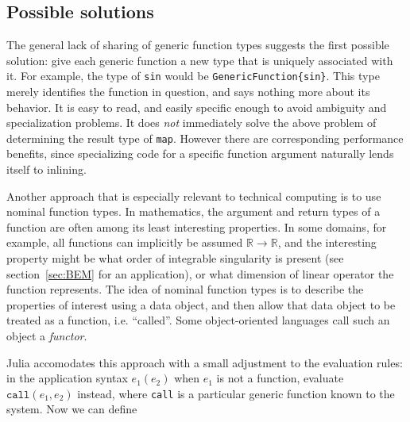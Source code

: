 \subsection{Possible solutions}

The general lack of sharing of generic function types suggests the first
possible solution: give each generic function a new type that is uniquely
associated with it. For example, the type of \texttt{sin} would be
\texttt{GenericFunction\{sin\}}. This type merely identifies the function
in question, and says nothing more about its behavior. It is easy to read,
and easily specific enough to avoid ambiguity and specialization
problems. It does \emph{not} immediately solve the above problem of
determining the result type of \texttt{map}. However there are
corresponding performance benefits, since specializing code for a
specific function argument naturally lends itself to inlining.


Another approach that is especially relevant to technical computing is to use
nominal function types.
In mathematics, the argument and return types of a function are often among its
least interesting properties.
In some domains, for example, all functions can implicitly be assumed
$\mathbb{R}\rightarrow\mathbb{R}$, and the interesting property might be
what order of integrable singularity is present (see section~\ref{sec:BEM} for
an application), or what dimension of linear operator the function represents.
The idea of nominal function types is to describe the properties of interest
using a data object, and then allow that data object to be treated as a
function, i.e. ``called''. Some object-oriented languages call such an object
a \emph{functor}.

Julia accomodates this approach with a small adjustment to the evaluation
rules: in the application syntax $e_1(e_2)$ when $e_1$ is not a function,
evaluate $\texttt{call}(e_1,e_2)$ instead, where \texttt{call} is
a particular generic function known to the system.
Now we can define

\vspace{-3ex}
\begin{singlespace}
\begin{lstlisting}[language=julia]

\end{lstlisting}
\end{singlespace}


